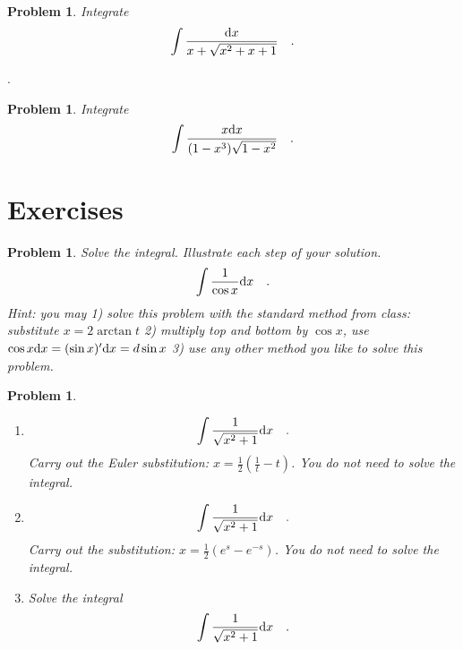 \documentclass[12pt]{book}
\newenvironment{solution}{\medskip\noindent\textbf{Solution.} }{$\Box$}
\newtheorem{problem}[theorem]{Problem}
\begin{document}
\begin{problem}

Integrate
\[
\int \frac{{\normalfont \text{d}} x}{x+\sqrt{x^2+x+1}}\quad .
\]
\end{problem}
\quad .
\begin{problem}
Integrate
\[
\int \frac{x{\normalfont \text{d}} x}{(1-x^3)\sqrt{1-x^2}}\quad .
\]
\end{problem}

\section{Exercises}
\begin{problem}
Solve the integral. Illustrate each step of your solution.
\[
\int \frac{1}{\cos x}{\normalfont \text{d}} x\quad .
\]
Hint: you may  1) solve this problem with the standard method from class: substitute $x=2 \arctan t$ 2)  multiply top and bottom by $\cos x$, use $\cos x {\normalfont \text{d}} x = (\sin x)' {\normalfont \text{d}} x = d\sin x$ 3) use any other method you like to solve this problem.
\end{problem}
\begin{problem}~
\begin{enumerate}
\item
\[
\int \frac{1}{\sqrt{x^2+1}}{\normalfont \text{d}} x\quad .
\]
Carry out the Euler substitution: $x=\frac12\left(\frac{1}{t}- t\right)$. You do not need to solve the integral.
\item
\[
\int \frac{1}{\sqrt{x^2+1}}{\normalfont \text{d}} x\quad .
\]
Carry out the substitution: $x=\frac12\left(e^s- e^{-s}\right)$. You do not need to solve the integral.
\item Solve the integral
\[
\int \frac{1}{\sqrt{x^2+1}}{\normalfont \text{d}} x\quad .
\]
\end{enumerate}
\end{problem}
\end{document}
